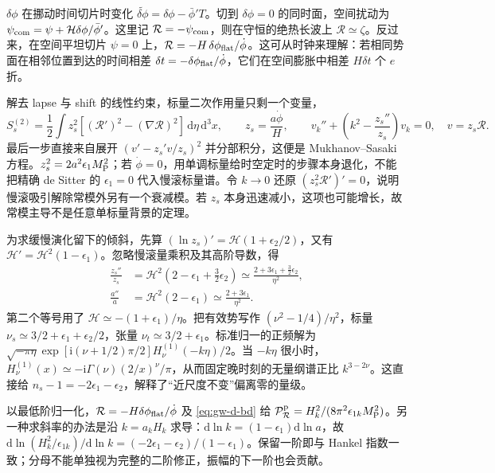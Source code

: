 $\delta\phi$ 在挪动时间切片时变化 $\widetilde{\delta\phi}=\delta\phi-\bar\phi'T$。切到 $\delta\phi=0$ 的同时面，空间扰动为 $\psi_{\rm com}=\psi+\mathcal H\delta\phi/\bar\phi'$。这里记 $\mathcal R=-\psi_{\rm com}$，则在守恒的绝热长波上 $\mathcal R\simeq\zeta$。反过来，在空间平坦切片 $\psi=0$ 上，$\mathcal R=-H\,\delta\phi_{\rm flat}/\dot\phi$。这可从时钟来理解：若相同势面在相邻位置到达的时间相差 $\delta t=-\delta\phi_{\rm flat}/\dot\phi$，它们在空间膨胀中相差 $H\delta t$ 个 $e$ 折。

解去 lapse 与 shift 的线性约束，标量二次作用量只剩一个变量，
\begin{equation}\label{eq:gw-d-ms}
 S_s^{(2)}=\frac12\int z_s^2[(\mathcal R')^2-(\nabla\mathcal R)^2]
          \,\mathrm d\eta\,\mathrm d^3x,\qquad
 z_s=\frac{a\dot\phi}{H},\qquad
 v_k''+\left(k^2-\frac{z_s''}{z_s}\right)v_k=0,\quad v=z_s\mathcal R .
\end{equation}
最后一步直接来自展开 $(v'-z_s'v/z_s)^2$ 并分部积分，这便是 Mukhanov--Sasaki 方程。$z_s^2=2a^2\epsilon_1M_{\rm P}^2$；若 $\dot\phi=0$，用单调标量给时空定时的步骤本身退化，不能把精确 de Sitter 的 $\epsilon_1=0$ 代入慢滚标量谱。令 $k\to0$ 还原 $(z_s^2\mathcal R')'=0$，说明慢滚吸引解除常模外另有一个衰减模。若 $z_s$ 本身迅速减小，这项也可能增长，故常模主导不是任意单标量背景的定理。

为求缓慢演化留下的倾斜，先算 $(\ln z_s)'=\mathcal H(1+\epsilon_2/2)$，又有 $\mathcal H'=\mathcal H^2(1-\epsilon_1)$。忽略慢滚量乘积及其高阶导数，得
\begin{align}
 \frac{z_s''}{z_s}&=\mathcal H^2\left(2-\epsilon_1+\tfrac32\epsilon_2\right)
 \simeq\frac{2+3\epsilon_1+\tfrac32\epsilon_2}{\eta^2},\nonumber\\
 \frac{a''}{a}&=\mathcal H^2(2-\epsilon_1)
 \simeq\frac{2+3\epsilon_1}{\eta^2}.\label{eq:gw-d-indices}
\end{align}
第二个等号用了 $\mathcal H\simeq-(1+\epsilon_1)/\eta$。把有效势写作 $(\nu^2-1/4)/\eta^2$，标量 $\nu_s\simeq3/2+\epsilon_1+\epsilon_2/2$，张量 $\nu_t\simeq3/2+\epsilon_1$。标准归一的正频解为 $\sqrt{-\pi\eta}\exp[\mathrm i(\nu+1/2)\pi/2]H_\nu^{(1)}(-k\eta)/2$。当 $-k\eta$ 很小时，$H_\nu^{(1)}(x)\simeq-\mathrm i\Gamma(\nu)(2/x)^\nu/\pi$，从而固定晚时刻的无量纲谱正比 $k^{3-2\nu}$。这直接给 $n_s-1=-2\epsilon_1-\epsilon_2$，解释了“近尺度不变”偏离零的量级。

以最低阶归一化，$\mathcal R=-H\delta\phi_{\rm flat}/\dot\phi$ 及 \eqref{eq:gw-d-bd} 给 $\mathcal P_{\mathcal R}^{\rm p}=H_k^2/(8\pi^2\epsilon_{1k}M_{\rm P}^2)$。另一种求斜率的办法是沿 $k=a_kH_k$ 求导：$\mathrm d\ln k=(1-\epsilon_1)\mathrm d\ln a$，故 $\mathrm d\ln(H_k^2/\epsilon_{1k})/\mathrm d\ln k=(-2\epsilon_1-\epsilon_2)/(1-\epsilon_1)$。保留一阶即与 Hankel 指数一致；分母不能单独视为完整的二阶修正，振幅的下一阶也会贡献。

